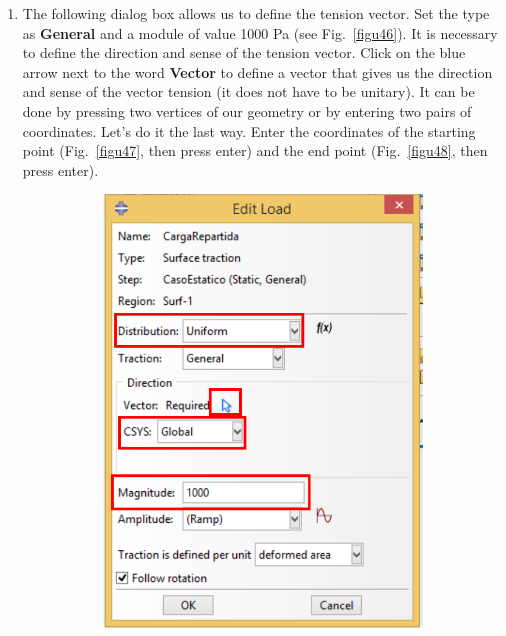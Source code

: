 \begin{enumerate}
\begin{figure}[H]
  \end{figure}
\item The following dialog box allows us to define the tension
  vector. Set the type as \textbf{General} and a module of value 1000
  Pa (see Fig.~\ref{figu46}). It is necessary to define the direction
  and sense of the tension vector. Click on the blue arrow next to the
  word \textbf{Vector} to define a vector that gives us the direction
  and sense of the vector tension (it does not have to be unitary). It
  can be done by pressing two vertices of our geometry or by entering
  two pairs of coordinates. Let's do it the last way. Enter the
  coordinates of the starting point (Fig.~\ref{figu47}, then press
  enter) and the end point (Fig.~\ref{figu48}, then press enter).

\begin{figure}[H]
  \centering
  \begin{varwidth}{0.40\linewidth} %
    \begin{subfigure}{0.95\textwidth}
      \includegraphics[width=\textwidth]{./body/images/imagen46.pdf}

\end{subfigure}
\end{varwidth}
\end{figure}
\end{enumerate}
